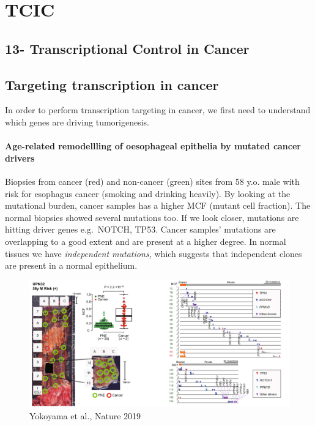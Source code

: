 \graphicspath{{chapters/_resources/}}

\chapter{TCIC}


\hypertarget{transcriptional-control-in-cancer}{%
\section{13- Transcriptional Control in Cancer}\label{transcriptional-control-in-cancer}}

\hypertarget{targeting-transcription-in-cancer}{%
\section{Targeting transcription in cancer}\label{targeting-transcription-in-cancer}}

In order to perform transcription targeting in cancer, we first need to understand which genes are driving tumorigenesis.

\hypertarget{age-related-remodellling-of-oesophageal-epithelia-by-mutated-cancer-drivers}{%
\subsubsection{\texorpdfstring{Age-related remodellling of \textbf{oesophageal epithelia by mutated cancer drivers}}{Age-related remodellling of oesophageal epithelia by mutated cancer drivers}}\label{age-related-remodellling-of-oesophageal-epithelia-by-mutated-cancer-drivers}}

Biopsies from cancer (red) and non-cancer (green) sites from 58 y.o. male with risk for esophagus cancer (smoking and drinking heavily). By looking at the mutational burden, cancer samples has a higher MCF (mutant cell fraction). The normal biopsies showed several mutations too. If we look closer, mutations are hitting driver genes e.g.~NOTCH, TP53. Cancer samples' mutations are overlapping to a good extent and are present at a higher degree. In normal tissues we have \emph{independent mutations,} which suggests that independent clones are present in a normal epithelium.

\begin{figure}
\centering
\includegraphics{../_resources/Screen_Shot_2022-11-04_at_10-50-01.png}
\caption{Yokoyama et al., Nature 2019}
\end{figure}

